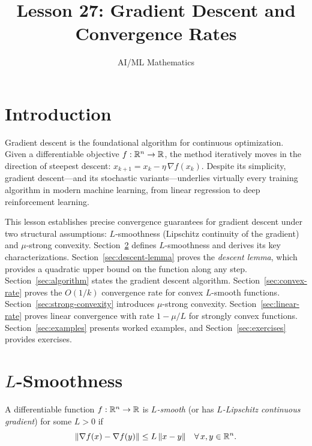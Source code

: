 \documentclass[11pt,a4paper]{article}
\title{Lesson 27: Gradient Descent and Convergence Rates}
\author{AI/ML Mathematics}
\date{}
\begin{document}
\maketitle
\tableofcontents
\newpage


\section{Introduction}\label{sec:intro}

Gradient descent is the foundational algorithm for continuous optimization.
Given a differentiable objective $f : \mathbb{R}^n \to \mathbb{R}$, the method iteratively
moves in the direction of steepest descent:
$x_{k+1} = x_k - \eta\, \nabla f(x_k)$. Despite its simplicity, gradient
descent---and its stochastic variants---underlies virtually every training
algorithm in modern machine learning, from linear regression to deep
reinforcement learning.

This lesson establishes precise convergence guarantees for gradient descent
under two structural assumptions: $L$-smoothness (Lipschitz continuity of
the gradient) and $\mu$-strong convexity. Section~\ref{sec:smoothness}
defines $L$-smoothness and derives its key characterizations.
Section~\ref{sec:descent-lemma} proves the \emph{descent lemma}, which
provides a quadratic upper bound on the function along any step.
Section~\ref{sec:algorithm} states the gradient descent algorithm.
Section~\ref{sec:convex-rate} proves the $O(1/k)$ convergence rate for
convex $L$-smooth functions. Section~\ref{sec:strong-convexity} introduces
$\mu$-strong convexity. Section~\ref{sec:linear-rate} proves linear
convergence with rate $1 - \mu/L$ for strongly convex functions.
Section~\ref{sec:examples} presents worked examples, and
Section~\ref{sec:exercises} provides exercises.


\section{$L$-Smoothness}\label{sec:smoothness}

\begin{definition}[$L$-smoothness]\label{def:smooth}
A differentiable function $f : \mathbb{R}^n \to \mathbb{R}$ is \emph{$L$-smooth} (or has
\emph{$L$-Lipschitz continuous gradient}) for some $L > 0$ if
\begin{equation}\label{eq:smooth}
  \|\nabla f(x) - \nabla f(y)\| \le L\, \|x - y\| \quad
  \forall\, x, y \in \mathbb{R}^n.
\end{equation}
\end{definition}
\end{document}
